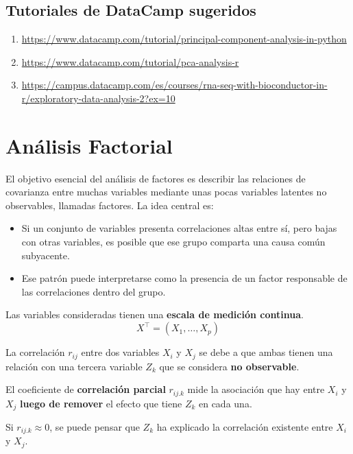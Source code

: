 \documentclass[
]{book}
\begin{document}
\section{Tutoriales de DataCamp sugeridos}\label{tutoriales-de-datacamp-sugeridos}

\begin{enumerate}
\def\labelenumi{\arabic{enumi})}
\item
  \url{https://www.datacamp.com/tutorial/principal-component-analysis-in-python}
\item
  \url{https://www.datacamp.com/tutorial/pca-analysis-r}
\item
  \url{https://campus.datacamp.com/es/courses/rna-seq-with-bioconductor-in-r/exploratory-data-analysis-2?ex=10}
\end{enumerate}

\chapter{Análisis Factorial}\label{anuxe1lisis-factorial}

El objetivo esencial del análisis de factores es describir las relaciones de covarianza entre muchas variables mediante unas pocas variables latentes no observables, llamadas factores. La idea central es:

\begin{itemize}
\item
  Si un conjunto de variables presenta correlaciones altas entre sí, pero bajas con otras variables, es posible que ese grupo comparta una causa común subyacente.
\item
  Ese patrón puede interpretarse como la presencia de un factor responsable de las correlaciones dentro del grupo.
\end{itemize}

Las variables consideradas tienen una \textbf{escala de medición continua}.
\[X^\top = (X_1, \dots, X_p)\]

La correlación \(r_{ij}\) entre dos variables \(X_i\) y \(X_j\) se debe a que ambas tienen una relación con una tercera variable \(Z_k\) que se considera \textbf{no observable}.

El coeficiente de \textbf{correlación parcial} \(r_{ij.k}\) mide la asociación que hay entre \(X_i\) y \(X_j\) \textbf{luego de remover} el efecto que tiene \(Z_k\) en cada una.

Si \(r_{ij.k} \approx 0\), se puede pensar que \(Z_k\) ha explicado la correlación existente entre \(X_i\) y \(X_j\).
\end{document}
